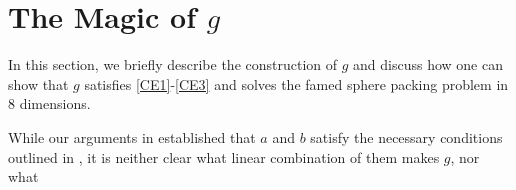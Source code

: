 \section{The Magic of $g$}
\label{Ch4:Sec:g_Properties}

In this section, we briefly describe the construction of $g$ and discuss how one can show that $g$ satisfies \ref{CE1}-\ref{CE3} and solves the famed sphere packing problem in $8$ dimensions.

While our arguments in  established that $a$ and $b$ satisfy the necessary conditions outlined in , it is neither clear what linear combination of them makes $g$, nor what 
